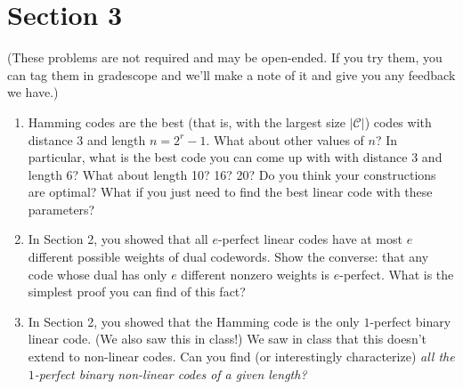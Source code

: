 \documentclass{article}
\newcommand{\cC}{\mathcal{C}}
\begin{document}
\section*{Section 3}
\setcounter{section}{3}
(These problems are not required and may be open-ended.  If you try them, you can tag them in gradescope and we'll make a note of it and give you any feedback we have.)
\begin{enumerate}
	\item Hamming codes are the best (that is, with the largest size $|\cC|$) codes with distance $3$ and length $n = 2^r - 1$.  What about other values of $n$?  In particular, what is the best code you can come up with with distance $3$ and length 6? What about length 10? 16? 20?  Do you think your constructions are optimal?  What if you just need to find the best linear code with these parameters?
	\item In Section 2, you showed that all $e$-perfect linear codes have at most $e$ different possible weights of dual codewords.  Show the converse: that any code whose dual has only $e$ different nonzero weights is $e$-perfect.  What is the simplest proof you can find of this fact?	
	\item In Section 2, you showed that the Hamming code is the only $1$-perfect binary linear code. (We also saw this in class!)  We saw in class that this doesn't extend to non-linear codes.  Can you find (or interestingly characterize) \em all \em the $1$-perfect binary non-linear codes of a given length?
\end{enumerate}
\end{document}
